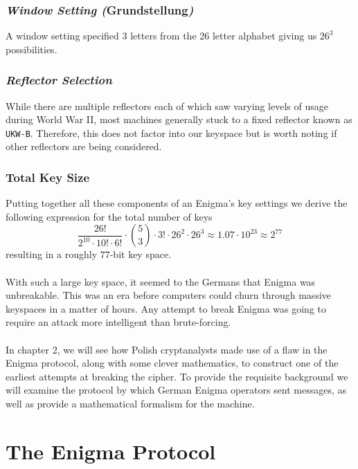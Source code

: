 \subsubsection{\emph{Window Setting (}Grundstellung\emph{)}}
A window setting specified 3 letters from the 26 letter alphabet
giving us $26^3$ possibilities.

\subsubsection{\emph{Reflector Selection}}
While there are multiple reflectors each of which saw varying levels
of usage during World War II, most machines generally stuck to a
fixed reflector known as \texttt{UKW-B}. Therefore, this does not
factor into our keyspace but is worth noting if other reflectors are
being considered.

\subsubsection{Total Key Size}
Putting together all these components of an Enigma's key settings we
derive the following expression for the total number of keys
\[
	\frac{26!}{2^{10}\cdot 10! \cdot 6!}\cdot{5\choose 3}\cdot3!\cdot
	26^2\cdot 26^3 \approx 1.07 \cdot 10^{23} \approx 2^{77}
\]
resulting in a roughly $77$-bit key space.
\\\\With such a large key space, it seemed to the Germans that Enigma
was unbreakable. This was an era before computers could churn through
massive keyspaces in a matter of hours. Any attempt to break Enigma
was going to require an attack more intelligent than brute-forcing.
\\\\In chapter 2, we will see how Polish cryptanalysts made use of a
flaw in the Enigma protocol, along with some clever mathematics, to
construct one of the earliest attempts at breaking the cipher. To
provide the requisite background we will examine the protocol by
which German Enigma operators sent messages, as well as provide a
mathematical formalism for the machine.

\section{The Enigma Protocol}\label{protocol}

